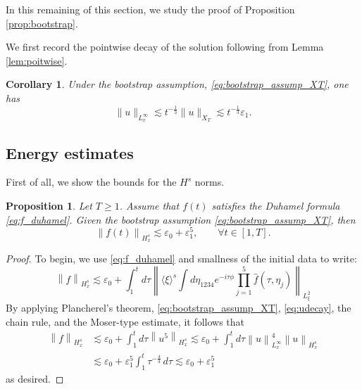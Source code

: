 \documentclass[reqno,english,11pt]{amsart}
\newcommand{\eps}{\varepsilon}
\newcommand{\snorm}[1]{\left\|#1\right\|}
\newtheorem{corollary}[theorem]{Corollary}
\newtheorem{proposition}[theorem]{Proposition}
\theoremstyle{definition}
\numberwithin{equation}{section}
\begin{document}
In this remaining of this section, we study the proof of Proposition \ref{prop:bootstrap}.  

We first record the pointwise decay of the solution following from Lemma \ref{lem:poitwise}.
\begin{corollary}
 Under the bootstrap assumption, \eqref{eq:bootstrap_assump_XT},     one has
\begin{equation}\label{eq:udecay}
    \|u\|_{L^\infty_x} \lesssim t^{-\frac{1}{3}} \|u\|_{X_T}\lesssim t^{-\frac{1}{3}} \varepsilon_1.
\end{equation}
\end{corollary}
\subsection{Energy estimates}
First of all, we show the bounds for the $H^s$ norms.

\begin{proposition}\label{prop:Hs_f_bootstrap}
Let $T\ge 1$. Assume that $f(t)$ satisfies the Duhamel formula \eqref{eq:f_duhamel}. Given the bootstrap assumption \eqref{eq:bootstrap_assump_XT}, then
$$\snorm{f(t)}_{H^s_x}\lesssim \eps_0+\eps_1^5,\qquad \forall t\in[1,T].$$
\end{proposition}
\begin{proof}
To begin, we use \eqref{eq:f_duhamel} and smallness of the initial data to write:
\begin{equation}
    \snorm{f}_{H^s_x}\lesssim \eps_0+\int^t_1 d \tau\snorm{\langle \xi\rangle^s \int d\eta_{1234}e^{-i\tau\phi}\prod^5_{j=1}\hat{f}(\tau,\eta_j)}_{L^2_\xi}
\end{equation}
By applying Plancherel’s theorem, \eqref{eq:bootstrap_assump_XT}, \eqref{eq:udecay}, the chain rule, and the Moser-type estimate, it follows that
\begin{align*}
    \snorm{f}_{H^s_x}&\lesssim \eps_0+\int^t_1 d \tau\snorm{u^5}_{H^s_x}\lesssim  \varepsilon_0+\int^t_1 d \tau\snorm{u}^4_{L^\infty_x}\snorm{u}_{H^s_x}\\
    &\lesssim \varepsilon_0+\eps_1^5\int^t_1 \tau^{-\frac{4}{3}}\,d\tau \lesssim \varepsilon_0+\eps_1^5
\end{align*}as desired.
\end{proof}
\end{document}
